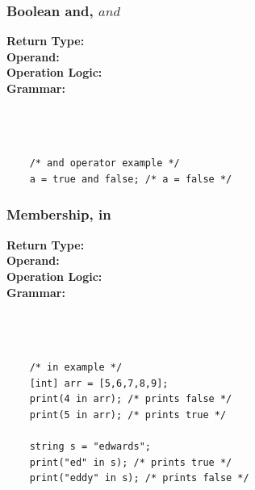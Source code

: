 \documentclass{article}
\begin{document}
    \subsubsection{Boolean and, $and$}
    \textbf{Return Type:}\\
    \textbf{Operand:}\\
    \textbf{Operation Logic:}\\
    \textbf{Grammar:}\\
    \\
    \\
    \\
    \begin{lstlisting}
    /* and operator example */
    a = true and false; /* a = false */
    \end{lstlisting}
    
    \subsubsection{Membership, in}
    \textbf{Return Type:}\\
    \textbf{Operand:}\\
    \textbf{Operation Logic:}\\
    \textbf{Grammar:}\\
    \\
    \\
    \\
    \begin{lstlisting}
    /* in example */
    [int] arr = [5,6,7,8,9];
    print(4 in arr); /* prints false */
    print(5 in arr); /* prints true */
    
    string s = "edwards";
    print("ed" in s); /* prints true */
    print("eddy" in s); /* prints false */
    \end{lstlisting}
\end{document}
